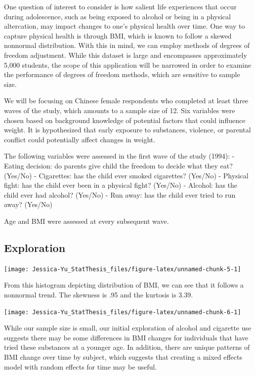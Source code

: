 \documentclass[12pt, twoside]{amherstthesis}
\begin{document}
One question of interest to consider is how salient life experiences that occur during adolescence, such as being exposed to alcohol or being in a physical altercation, may impact changes to one's physical health over time. One way to capture physical health is through BMI, which is known to follow a skewed nonnormal distribution. With this in mind, we can employ methods of degrees of freedom adjustment. While this dataset is large and encompasses approximately 5,000 students, the scope of this application will be narrowed in order to examine the performance of degrees of freedom methods, which are sensitive to sample size.

We will be focusing on Chinese female respondents who completed at least three waves of the study, which amounts to a sample size of 12. Six variables were chosen based on background knowledge of potential factors that could influence weight. It is hypothesized that early exposure to substances, violence, or parental conflict could potentially affect changes in weight.

The following variables were assessed in the first wave of the study (1994):
- Eating decision: do parents give child the freedom to decide what they eat? (Yes/No)
- Cigarettes: has the child ever smoked cigarettes? (Yes/No)
- Physical fight: has the child ever been in a physical fight? (Yes/No)
- Alcohol: has the child ever had alcohol? (Yes/No)
- Run away: has the child ever tried to run away? (Yes/No)

Age and BMI were assessed at every subsequent wave.

\hypertarget{exploration}{%
\subsection{Exploration}\label{exploration}}
\begin{center}\texttt{[image: Jessica-Yu\_StatThesis\_files/figure-latex/unnamed-chunk-5-1]} \end{center}

From this histogram depicting distribution of BMI, we can see that it follows a nonnormal trend. The skewness is .95 and the kurtosis is 3.39.
\begin{center}\texttt{[image: Jessica-Yu\_StatThesis\_files/figure-latex/unnamed-chunk-6-1]} \end{center}

While our sample size is small, our initial exploration of alcohol and cigarette use suggests there may be some differences in BMI changes for individuals that have tried these substances at a younger age. In addition, there are unique patterns of BMI change over time by subject, which suggests that creating a mixed effects model with random effects for time may be useful.
\end{document}
